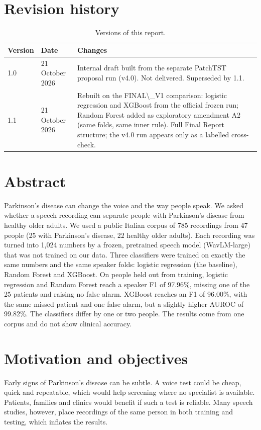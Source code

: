 \documentclass[11pt,a4paper]{article}
\begin{document}
\section*{Revision history}
\begin{table}[H]\centering\small\renewcommand{\arraystretch}{1.15}
\caption{Versions of this report.}
\begin{tabular}{llp{11cm}}
\toprule
\textbf{Version} & \textbf{Date} & \textbf{Changes}\\
\midrule
1.0 & 21 October 2026 & Internal draft built from the separate PatchTST proposal run (v4.0). Not delivered. Superseded by 1.1.\\
1.1 & 21 October 2026 & Rebuilt on the FINAL\textbackslash{}\_V1 comparison: logistic regression and XGBoost from the official frozen run; Random Forest added as exploratory amendment A2 (same folds, same inner rule). Full Final Report structure; the v4.0 run appears only as a labelled cross-check.\\
\bottomrule
\end{tabular}\end{table}
\section{Abstract}\label{sec:abstract}
Parkinson's disease can change the voice and the way people speak. We asked whether a speech recording can separate people with Parkinson's disease from healthy older adults. We used a public Italian corpus of 785 recordings from 47 people (25 with Parkinson's disease, 22 healthy older adults). Each recording was turned into 1,024 numbers by a frozen, pretrained speech model (WavLM-large) that was not trained on our data. Three classifiers were trained on exactly the same numbers and the same speaker folds: logistic regression (the baseline), Random Forest and XGBoost. On people held out from training, logistic regression and Random Forest reach a speaker F1 of 97.96\%, missing one of the 25 patients and raising no false alarm. XGBoost reaches an F1 of 96.00\%, with the same missed patient and one false alarm, but a slightly higher AUROC of 99.82\%. The classifiers differ by one or two people. The results come from one corpus and do not show clinical accuracy.

\section{Motivation and objectives}\label{sec:motivation}
Early signs of Parkinson's disease can be subtle. A voice test could be cheap, quick and repeatable, which would help screening where no specialist is available. Patients, families and clinics would benefit if such a test is reliable. Many speech studies, however, place recordings of the same person in both training and testing, which inflates the results.
\end{document}
